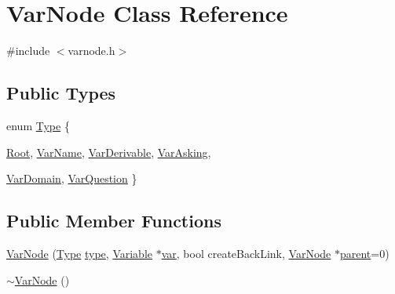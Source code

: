 \hypertarget{class_var_node}{
\section{VarNode Class Reference}
\label{class_var_node}
}


{\ttfamily \#include $<$varnode.h$>$}

\subsection*{Public Types}
\begin{DoxyCompactItemize}
\item 
enum \hyperlink{class_var_node_a48af8dc13f1e224b21c7ad1d4763c075}{Type} \{ \par
\hyperlink{class_var_node_a48af8dc13f1e224b21c7ad1d4763c075a2dfa026b193cf15866b8ee5571133fb5}{Root}, 
\hyperlink{class_var_node_a48af8dc13f1e224b21c7ad1d4763c075a841754851903281929942dbaf15bbef8}{VarName}, 
\hyperlink{class_var_node_a48af8dc13f1e224b21c7ad1d4763c075a7d5f6d1b2c2b86d00d3532c5123d724c}{VarDerivable}, 
\hyperlink{class_var_node_a48af8dc13f1e224b21c7ad1d4763c075a077c40e68e3776cc1d7b7fc9df26eb2d}{VarAsking}, 
\par
\hyperlink{class_var_node_a48af8dc13f1e224b21c7ad1d4763c075a209927fa44486f9212188ab547f4b4c9}{VarDomain}, 
\hyperlink{class_var_node_a48af8dc13f1e224b21c7ad1d4763c075ae3b1136fc61a7f6bba0e7707edec32dc}{VarQuestion}
 \}
\end{DoxyCompactItemize}
\subsection*{Public Member Functions}
\begin{DoxyCompactItemize}
\item 
\hyperlink{class_var_node_a88b89e06868d03491a7c48dc5998643c}{VarNode} (\hyperlink{class_var_node_a48af8dc13f1e224b21c7ad1d4763c075}{Type} \hyperlink{class_var_node_ac8a7356019869b99be0dad760909e510}{type}, \hyperlink{class_variable}{Variable} $\ast$\hyperlink{class_var_node_a3fbf3232482e35a5d1e2bfb2ac58bc47}{var}, bool createBackLink, \hyperlink{class_var_node}{VarNode} $\ast$\hyperlink{class_var_node_a161c85b938b0ca27ee263ec70394dcca}{parent}=0)
\item 
\hyperlink{class_var_node_a3e893219a9544192cc1a50324ec48aa2}{$\sim$VarNode} ()
\end{DoxyCompactItemize}
